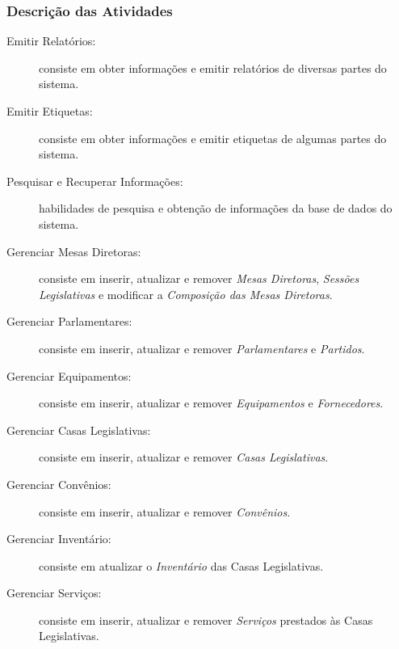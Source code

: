 \subsubsection{Descrição das Atividades}
\begin{description}
\item[Emitir Relatórios:] consiste em obter informações e emitir
  relatórios de diversas partes do sistema.
\item[Emitir Etiquetas:] consiste em obter informações e emitir
  etiquetas de algumas partes do sistema.
\item[Pesquisar e Recuperar Informações:] habilidades de pesquisa e
  obtenção de informações da base de dados do sistema.
\item[Gerenciar Mesas Diretoras:] consiste em inserir, atualizar e
  remover \emph{Mesas Diretoras}, \emph{Sessões Legislativas} e
  modificar a \emph{Composição das Mesas Diretoras}.
\item[Gerenciar Parlamentares:] consiste em inserir, atualizar e
  remover \emph{Parlamentares} e \emph{Partidos}.
\item[Gerenciar Equipamentos:] consiste em inserir, atualizar e
  remover \emph{Equipamentos} e \emph{Fornecedores}.
\item[Gerenciar Casas Legislativas:] consiste em inserir, atualizar e
  remover \emph{Casas Legislativas}.
\item[Gerenciar Convênios:] consiste em inserir, atualizar e remover
  \emph{Convênios}.
\item[Gerenciar Inventário:] consiste em atualizar o \emph{Inventário}
  das Casas Legislativas.
\item[Gerenciar Serviços:] consiste em inserir, atualizar e remover
  \emph{Serviços} prestados às Casas Legislativas.
\end{description}

%
%

